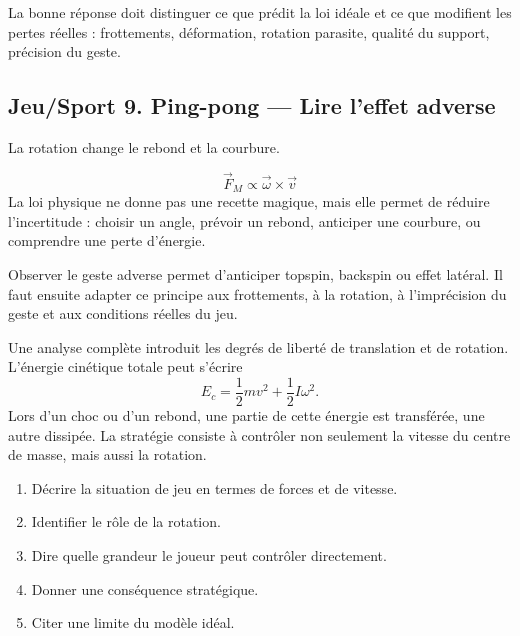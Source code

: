 \documentclass[11pt,a4paper]{article}
\begin{document}
\begin{corrigebox}[Indication]
La bonne réponse doit distinguer ce que prédit la loi idéale et ce que modifient les pertes réelles : frottements, déformation, rotation parasite, qualité du support, précision du geste.
\end{corrigebox}


\subsection{Jeu/Sport 9. Ping-pong — Lire l'effet adverse}

\begin{exemplebox}[Observation]
La rotation change le rebond et la courbure.
\end{exemplebox}

\begin{theorembox}
\[
\vec F_M\propto \vec\omega\times\vec v
\]
La loi physique ne donne pas une recette magique, mais elle permet de réduire l'incertitude : choisir un angle, prévoir un rebond, anticiper une courbure, ou comprendre une perte d'énergie.
\end{theorembox}

\begin{methodebox}
Observer le geste adverse permet d'anticiper topspin, backspin ou effet latéral.
Il faut ensuite adapter ce principe aux frottements, à la rotation, à l'imprécision du geste et aux conditions réelles du jeu.
\end{methodebox}

\begin{approfondissementbox}
Une analyse complète introduit les degrés de liberté de translation et de rotation. L'énergie cinétique totale peut s'écrire
\[
E_c=\frac12mv^2+\frac12I\omega^2.
\]
Lors d'un choc ou d'un rebond, une partie de cette énergie est transférée, une autre dissipée. La stratégie consiste à contrôler non seulement la vitesse du centre de masse, mais aussi la rotation.
\end{approfondissementbox}

\begin{exercicebox}
\begin{enumerate}
  \item Décrire la situation de jeu en termes de forces et de vitesse.
  \item Identifier le rôle de la rotation.
  \item Dire quelle grandeur le joueur peut contrôler directement.
  \item Donner une conséquence stratégique.
  \item Citer une limite du modèle idéal.
\end{enumerate}
\end{exercicebox}
\end{document}
